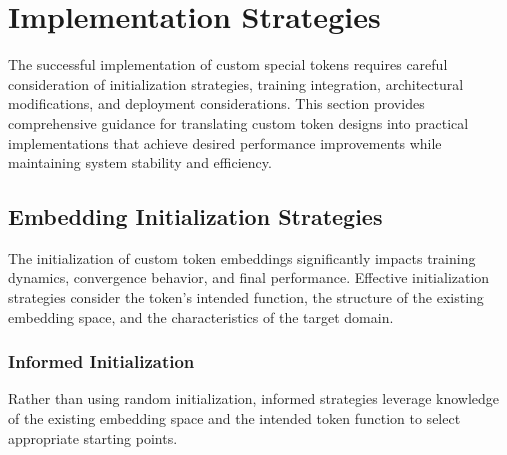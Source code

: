 
\section{Implementation Strategies}

The successful implementation of custom special tokens requires careful consideration of initialization strategies, training integration, architectural modifications, and deployment considerations. This section provides comprehensive guidance for translating custom token designs into practical implementations that achieve desired performance improvements while maintaining system stability and efficiency.

\subsection{Embedding Initialization Strategies}

The initialization of custom token embeddings significantly impacts training dynamics, convergence behavior, and final performance. Effective initialization strategies consider the token's intended function, the structure of the existing embedding space, and the characteristics of the target domain.
\begin{comment}
Feedback: Before linking to the code, it's crucial to explain the core idea. For example: "A key decision is how to initialize the embedding for a new token. A poor initialization can destabilize training. The two main strategies are:
1.  **Random Initialization**: Simple, but can slow down convergence as the model has to learn the token's meaning from scratch. It's important to use a small standard deviation to avoid large initial gradients.
2.  **Informed Initialization**: A more effective approach where the new token's embedding is initialized based on the embeddings of existing, semantically related tokens. This gives the model a strong 'hint' about the token's purpose and can significantly speed up learning."
\end{comment}

\subsubsection{Informed Initialization}

Rather than using random initialization, informed strategies leverage knowledge of the existing embedding space and the intended token function to select appropriate starting points.

